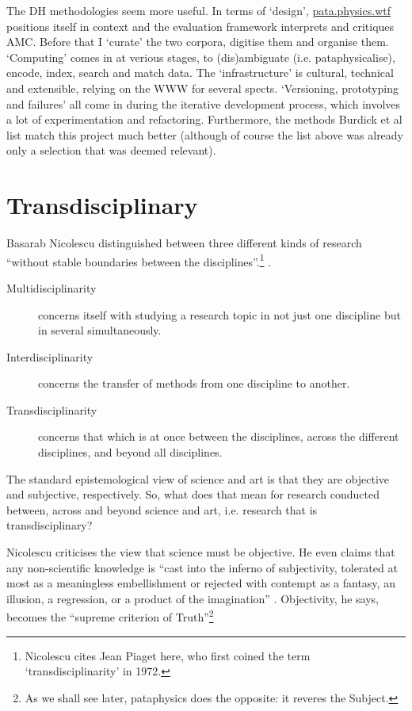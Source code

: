 The \ac{DH} methodologies seem more useful. In terms of `design', \url{pata.physics.wtf} positions itself in context and the evaluation framework interprets and critiques \ac{AMC}. Before that I `curate' the two corpora, digitise them and organise them. `Computing' comes in at verious stages, to (dis)ambiguate (i.e. pataphysicalise), encode, index, search and match data. The `infrastructure' is cultural, technical and extensible, relying on the \ac{WWW} for several spects. `Versioning, prototyping and failures' all come in during the iterative development process, which involves a lot of experimentation and refactoring. Furthermore, the methods Burdick et al \citeyear{Burdick2012} list match this project much better (although of course the list above was already only a selection that was deemed relevant).


\section{Transdisciplinary}

Basarab Nicolescu distinguished between three different kinds of research ``without stable boundaries between the disciplines''.\footnote{Nicolescu cites Jean Piaget here, who first coined the term `transdisciplinarity' in 1972.} \citeyear{Nicolescu2010}.

\begin{description}
  \item [Multidisciplinarity]	concerns itself with studying a research topic in not just one discipline but in several simultaneously.
  \item [Interdisciplinarity]	concerns the transfer of methods from one discipline to another.
  \item [Transdisciplinarity]	concerns that which is at once between the disciplines, across the different disciplines, and beyond all disciplines.
\end{description}

The standard epistemological view of science and art is that they are objective and subjective, respectively. So, what does that mean for research conducted between, across and beyond science and art, i.e. research that is transdisciplinary?

Nicolescu criticises the view that science must be objective. He even claims that any non-scientific knowledge is ``cast into the inferno of subjectivity, tolerated at most as a meaningless embellishment or rejected with contempt as a fantasy, an illusion, a regression, or a product of the imagination'' \citeyear{Nicolescu2010}. Objectivity, he says, becomes the ``supreme criterion of Truth''\footnote{As we shall see later, pataphysics does the opposite: it reveres the Subject.}

